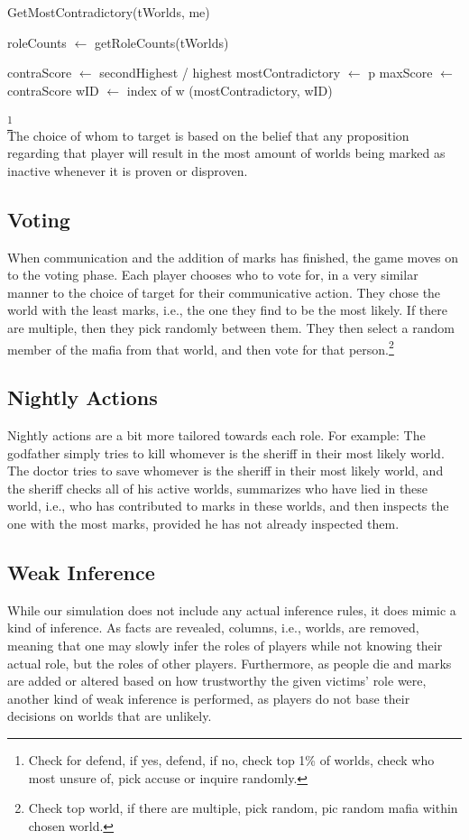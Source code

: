 \begin{algorithm}[H]
	\caption{GetMostContradictory(tWorlds, me)}
	\begin{algorithmic}
		\State roleCounts $\gets$ getRoleCounts(tWorlds)

		\State contraScore $\gets$ secondHighest / highest
		\State mostContradictory $\gets$ p
		\State maxScore $\gets$ contraScore
		\State wID $\gets$ index of w
		\EndIf
		\EndFor
		\EndFor
		\State \Return (mostContradictory, wID)
	\end{algorithmic}
\end{algorithm}
\footnote[1]{Check for defend, if yes,
	defend, if no, check top 1\% of worlds, check who most unsure of, pick accuse
	or inquire randomly.}\\
The choice of whom to target is based on the belief that any proposition
regarding that player will result in the most amount of worlds being marked as
inactive whenever it is proven or disproven.
\subsection{Voting}\label{Voting}
When communication and the addition of marks has finished, the game moves on to
the voting phase. Each player chooses who to vote for, in a very similar manner
to the choice of target for their communicative action. They chose the world
with the least marks, i.e., the one they find to be the most likely. If there
are multiple, then they pick randomly between them. They then select a random
member of the mafia from that world, and then vote for that
person.\footnote[2]{ Check top world, if there are multiple, pick random, pic
	random mafia within chosen world.}
\subsection{Nightly Actions}\label{NightlyActions}
Nightly actions are a bit more tailored towards each role. For example: The
godfather simply tries to kill whomever is the sheriff in their most likely
world. The doctor tries to save whomever is the sheriff in their most likely
world, and the sheriff checks all of his active worlds, summarizes who have
lied in these world, i.e., who has contributed to marks in these worlds, and
then inspects the one with the most marks, provided he has not already
inspected them.
\subsection{Weak Inference}\label{WeakInference}
While our simulation does not include any actual inference rules, it does mimic
a kind of inference. As facts are revealed, columns, i.e., worlds, are removed,
meaning that one may slowly infer the roles of players while not knowing their
actual role, but the roles of other players. Furthermore, as people die and
marks are added or altered based on how trustworthy the given victims' role
were, another kind of weak inference is performed, as players do not base their
decisions on worlds that are unlikely.
